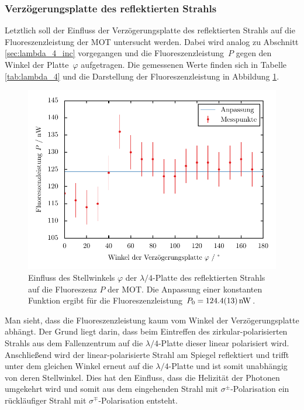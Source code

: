 \documentclass[11pt, a4paper]{article}
\numberwithin{equation}{section}
\begin{document}
\subsubsection{Verzögerungsplatte des reflektierten Strahls}
Letztlich soll der Einfluss der Verzögerungsplatte des reflektierten Strahls auf die Fluoreszenzleistung der MOT untersucht werden.
Dabei wird analog zu Abschnitt \ref{sec:lambda_4_inc} vorgegangen und die Fluoreszenzleistung~$P$ gegen den Winkel der Platte~$\varphi$ aufgetragen.
Die gemessenen Werte finden sich in Tabelle \ref{tab:lambda_4} und die Darstellung der Fluoreszenzleistung in Abbildung \ref{fig:lambda_4_out}.
\begin{figure}[h]
	\centering
	\includegraphics{./figures/lambda_4_out.pdf}
	\caption{Einfluss des Stellwinkels $\varphi$ der $\lambda / 4$-Platte des reflektierten Strahls auf die Fluoreszenz $P$ der MOT. Die Anpassung einer konstanten Funktion ergibt für die Fluoreszenzleistung $P_0 = \SI{124.4 +- 1.3}{nW}$.}
	\label{fig:lambda_4_out}
\end{figure}

Man sieht, dass die Fluoreszenzleistung kaum vom Winkel der Verzögerungsplatte abhängt.
Der Grund liegt darin, dass beim Eintreffen des zirkular-polarisierten Strahls aus dem Fallenzentrum auf die $\lambda / 4$-Platte dieser linear polarisiert wird.
Anschließend wird der linear-polarisierte Strahl am Spiegel reflektiert und trifft unter dem gleichen Winkel erneut auf die $\lambda / 4$-Platte und ist somit unabhängig von deren Stellwinkel.
Dies hat den Einfluss, dass die Helizität der Photonen umgekehrt wird und somit aus dem eingehenden Strahl mit $\sigma^\pm$-Polarisation ein rückläufiger Strahl mit $\sigma^\mp$-Polarisation entsteht.
\end{document}
